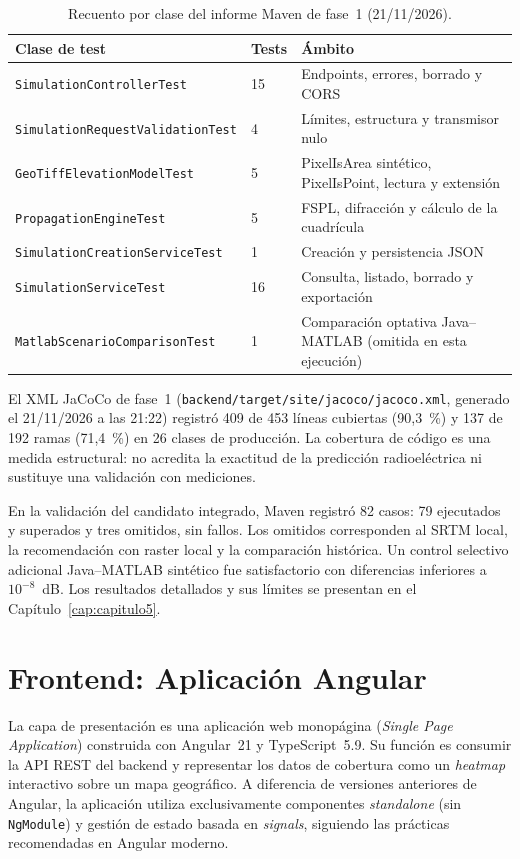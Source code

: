 \begin{table}[H]
\centering
\caption{Recuento por clase del informe Maven de fase~1 (21/11/2026).}
\label{tab:tests_backend}
\small
\begin{tabularx}{\textwidth}{|l|X|X|}
\hline
\textbf{Clase de test} & \textbf{Tests} & \textbf{Ámbito} \\
\hline
\texttt{SimulationControllerTest} & 15 & Endpoints, errores, borrado y CORS \\
\texttt{SimulationRequestValidationTest} & 4 & Límites, estructura y transmisor nulo \\
\texttt{GeoTiffElevationModelTest} & 5 & PixelIsArea sintético, PixelIsPoint, lectura y extensión \\
\texttt{PropagationEngineTest} & 5 & FSPL, difracción y cálculo de la cuadrícula \\
\texttt{SimulationCreationServiceTest} & 1 & Creación y persistencia JSON \\
\texttt{SimulationServiceTest} & 16 & Consulta, listado, borrado y exportación \\
\texttt{MatlabScenarioComparisonTest} & 1 & Comparación optativa Java--MATLAB (omitida en esta ejecución) \\
\hline
\end{tabularx}
\end{table}

El XML JaCoCo de fase~1 (\texttt{backend/target/site/jacoco/jacoco.xml}, generado el
21/11/2026 a las 21:22) registr\'o 409 de 453 l\'ineas cubiertas (90,3~\%) y 137 de 192
ramas (71,4~\%) en 26 clases de producci\'on. La cobertura de c\'odigo es una medida
estructural: no acredita la exactitud de la predicci\'on radioel\'ectrica ni sustituye una
validaci\'on con mediciones.

En la validación del candidato integrado, Maven registró 82 casos: 79 ejecutados y
superados y tres omitidos, sin fallos. Los omitidos corresponden al SRTM local, la
recomendación con raster local y la comparación histórica. Un control selectivo
adicional Java--MATLAB sintético fue satisfactorio con diferencias inferiores a
$10^{-8}$~dB. Los resultados detallados y sus límites se presentan en el
Capítulo~\ref{cap:capitulo5}.

\section{Frontend: Aplicación Angular}
\label{sec:impl_frontend}

La capa de presentación es una aplicación web monopágina (\textit{Single Page
Application}) construida con Angular~21 y TypeScript~5.9. Su función es consumir la
API REST del backend y representar los datos de cobertura como un \textit{heatmap}
interactivo sobre un mapa geográfico. A diferencia de versiones anteriores de Angular,
la aplicación utiliza exclusivamente componentes \textit{standalone} (sin
\texttt{NgModule}) y gestión de estado basada en \textit{signals}, siguiendo las
prácticas recomendadas en Angular moderno.

